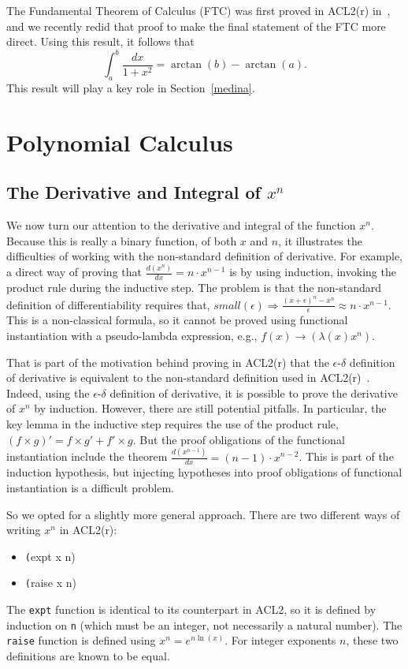 \documentclass[copyright,creativecommons]{eptcs}
\begin{document}
The Fundamental Theorem of Calculus (FTC) was first proved in ACL2(r)
in~\cite{Kau:ftc}, and we recently redid that proof to make the final
statement of the FTC more direct. Using this result, it follows that
\begin{equation}
\int_{a}^{b}{\frac{dx}{1+x^2}} = \arctan(b) - \arctan(a).
\end{equation}
This result will play a key role in Section~\ref{medina}.

\section{Polynomial Calculus}
\label{polys}

\subsection{The Derivative and Integral of $x^n$}

We now turn our attention to the derivative and integral of the
function $x^n$. Because this is really a binary function, of both
$x$ and $n$, it illustrates the difficulties of working with the
non-standard definition of derivative.  For example, a direct way of
proving that $\frac{d(x^n)}{dx} = n \cdot x^{n-1}$ is by using
induction, invoking the product rule during the inductive step. The
problem is that the non-standard definition of differentiability
requires that, $small(\epsilon) \Rightarrow \frac{(x+\epsilon)^n -
  x^n}{\epsilon} \approx n \cdot x^{n-1}$. This is a non-classical
formula, so it cannot be proved using functional instantiation with a
pseudo-lambda expression, e.g., $f(x) \rightarrow (\lambda (x)
x^n)$.

That is part of the motivation behind proving in ACL2(r) that the
$\epsilon$-$\delta$ definition of derivative is equivalent to the
non-standard definition used in ACL2(r)~\cite{CoGa:equivalences}.  
Indeed, using the $\epsilon$-$\delta$ definition of derivative, it is
possible to prove the derivative of $x^n$ by induction. However, there
are still potential pitfalls. In particular, the key lemma in the
inductive step requires the use of the product rule, $(f \times g)' =
f \times g' + f' \times g$.  But the proof obligations of the
functional instantiation include the theorem $\frac{d(x^{n-1})}{dx} =
(n-1) \cdot x^{n-2}$. This is part of the induction hypothesis, but
injecting hypotheses into proof obligations of functional
instantiation is a difficult problem.

So we opted for a slightly more general approach.  There are two
different ways of writing $x^n$ in ACL2(r):
\begin{itemize}
\item \texttt(expt x n)
\item \texttt(raise x n)
\end{itemize}
The \texttt{expt} function is identical to its counterpart in ACL2, so
it is defined by induction on \texttt{n} (which must be an integer, not
necessarily a natural number). The \texttt{raise} function is defined
using $x^n = e^{n \ln(x)}$. For integer exponents $n$, these two
definitions are known to be equal.
\end{document}
